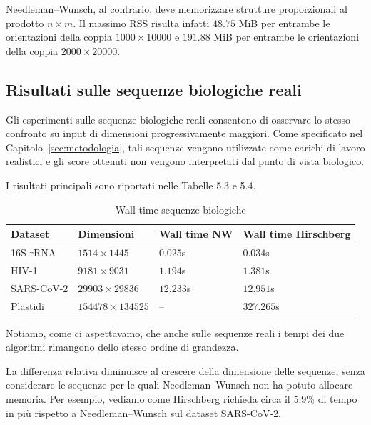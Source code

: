 Needleman--Wunsch, al contrario, deve memorizzare strutture proporzionali al prodotto $n  \times m$. Il massimo RSS
risulta infatti $48.75$ MiB per entrambe le orientazioni della coppia $1000  \times 10000$ e $191.88$ MiB per entrambe le
orientazioni della coppia $2000  \times 20000$.

\subsection{Risultati sulle sequenze biologiche reali}

Gli esperimenti sulle sequenze biologiche reali consentono di osservare lo stesso confronto su input di dimensioni progressivamente
maggiori. Come specificato nel Capitolo~\ref{sec:metodologia}, tali sequenze vengono utilizzate come carichi di lavoro realistici e gli
score ottenuti non vengono interpretati dal punto di vista biologico.

I risultati principali sono riportati nelle Tabelle 5.3 e 5.4.

\begin{table}[h]
    \centering
    \begin{tabular}{llll}
        \hline
        \textbf{Dataset} & \textbf{Dimensioni} & \textbf{Wall time NW} & \textbf{Wall time Hirschberg} \\
        \hline
        16S rRNA   & $1514  \times 1445$     & $0.025$s  & $0.034$s \\
        HIV-1      & $9181  \times 9031$     & $1.194$s  & $1.381$s \\
        SARS-CoV-2 & $29903  \times 29836$   & $12.233$s & $12.951$s \\
        Plastidi   & $154478  \times 134525$ & --        & $327.265$s \\
        \hline
    \end{tabular}
    \caption{Wall time sequenze biologiche}
    \label{tab:tempi_sequenze_bio}
\end{table}

Notiamo, come ci aspettavamo, che anche sulle sequenze reali i tempi dei due algoritmi rimangono dello stesso ordine di grandezza.

La differenza relativa diminuisce al crescere della dimensione delle sequenze, senza considerare le sequenze per le quali Needleman--Wunsch
non ha potuto allocare memoria. Per esempio, vediamo come Hirschberg richieda circa il $5.9$\% di tempo in più rispetto a Needleman--Wunsch
sul dataset SARS-CoV-2.

